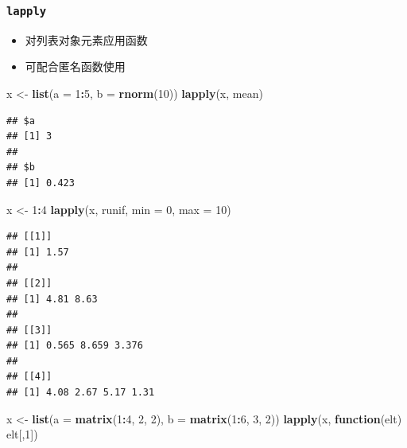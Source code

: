 \documentclass[
]{book}
\newenvironment{Shaded}{\begin{snugshade}}{\end{snugshade}}
\newcommand{\ControlFlowTok}[1]{\textcolor[rgb]{0.13,0.29,0.53}{\textbf{#1}}}
\newcommand{\DataTypeTok}[1]{\textcolor[rgb]{0.13,0.29,0.53}{#1}}
\newcommand{\DecValTok}[1]{\textcolor[rgb]{0.00,0.00,0.81}{#1}}
\newcommand{\KeywordTok}[1]{\textcolor[rgb]{0.13,0.29,0.53}{\textbf{#1}}}
\newcommand{\NormalTok}[1]{#1}
\newcommand{\OperatorTok}[1]{\textcolor[rgb]{0.81,0.36,0.00}{\textbf{#1}}}
\newcommand{\StringTok}[1]{\textcolor[rgb]{0.31,0.60,0.02}{#1}}
\providecommand{\tightlist}{%
  \setlength{\itemsep}{0pt}\setlength{\parskip}{0pt}}
\begin{document}
\hypertarget{lapply}{%
\subsubsection{\texorpdfstring{\texttt{lapply}}{lapply}}\label{lapply}}

\begin{itemize}
\tightlist
\item
  对列表对象元素应用函数
\item
  可配合匿名函数使用
\end{itemize}

\begin{Shaded}
\begin{Highlighting}[]
\NormalTok{x <-}\StringTok{ }\KeywordTok{list}\NormalTok{(}\DataTypeTok{a =} \DecValTok{1}\OperatorTok{:}\DecValTok{5}\NormalTok{, }\DataTypeTok{b =} \KeywordTok{rnorm}\NormalTok{(}\DecValTok{10}\NormalTok{))}
\KeywordTok{lapply}\NormalTok{(x, mean)}
\end{Highlighting}
\end{Shaded}

\begin{verbatim}
## $a
## [1] 3
## 
## $b
## [1] 0.423
\end{verbatim}

\begin{Shaded}
\begin{Highlighting}[]
\NormalTok{x <-}\StringTok{ }\DecValTok{1}\OperatorTok{:}\DecValTok{4}
\KeywordTok{lapply}\NormalTok{(x, runif, }\DataTypeTok{min =} \DecValTok{0}\NormalTok{, }\DataTypeTok{max =} \DecValTok{10}\NormalTok{)}
\end{Highlighting}
\end{Shaded}

\begin{verbatim}
## [[1]]
## [1] 1.57
## 
## [[2]]
## [1] 4.81 8.63
## 
## [[3]]
## [1] 0.565 8.659 3.376
## 
## [[4]]
## [1] 4.08 2.67 5.17 1.31
\end{verbatim}

\begin{Shaded}
\begin{Highlighting}[]
\NormalTok{x <-}\StringTok{ }\KeywordTok{list}\NormalTok{(}\DataTypeTok{a =} \KeywordTok{matrix}\NormalTok{(}\DecValTok{1}\OperatorTok{:}\DecValTok{4}\NormalTok{, }\DecValTok{2}\NormalTok{, }\DecValTok{2}\NormalTok{), }\DataTypeTok{b =} \KeywordTok{matrix}\NormalTok{(}\DecValTok{1}\OperatorTok{:}\DecValTok{6}\NormalTok{, }\DecValTok{3}\NormalTok{, }\DecValTok{2}\NormalTok{))}
\KeywordTok{lapply}\NormalTok{(x, }\ControlFlowTok{function}\NormalTok{(elt) elt[,}\DecValTok{1}\NormalTok{])}
\end{Highlighting}
\end{Shaded}
\end{document}
